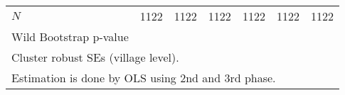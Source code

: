 {\begin{tabular}{l*{6}{c}}
\hline
\(N\)       &        1122         &        1122         &        1122         &        1122         &        1122         &        1122         \\
Wild Bootstrap p-value &                     &                     &                     &                     &                     &                     \\
\hline\hline
\multicolumn{7}{l}{\footnotesize Cluster robust SEs (village level).}\\
\multicolumn{7}{l}{\footnotesize Estimation is done by OLS using 2nd and 3rd phase.}\\
\end{tabular}
}
